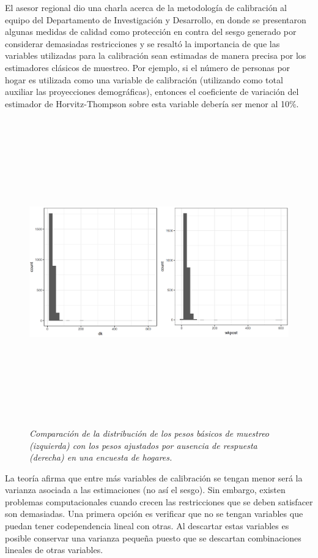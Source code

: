 \documentclass[
  12pt,
  spanish,
]{book}
\begin{document}
El asesor regional dio una charla acerca de la metodología de calibración al equipo del Departamento de Investigación y Desarrollo, en donde se presentaron algunas medidas de calidad como protección en contra del sesgo generado por considerar demasiadas restricciones y se resaltó la importancia de que las variables utilizadas para la calibración sean estimadas de manera precisa por los estimadores clásicos de muestreo. Por ejemplo, si el número de personas por hogar es utilizada como una variable de calibración (utilizando como total auxiliar las proyecciones demográficas), entonces el coeficiente de variación del estimador de Horvitz-Thompson sobre esta variable debería ser menor al 10\%.

\begin{figure}
\centering
\includegraphics[width=\textwidth,height=5.20833in]{Pics/18.png}
\caption{\emph{Comparación de la distribución de los pesos básicos de muestreo (izquierda) con los pesos ajustados por ausencia de respuesta (derecha) en una encuesta de hogares.}}
\end{figure}

La teoría afirma que entre más variables de calibración se tengan menor será la varianza asociada a las estimaciones (no así el sesgo). Sin embargo, existen problemas computacionales cuando crecen las restricciones que se deben satisfacer son demasiadas. Una primera opción es verificar que no se tengan variables que puedan tener codependencia lineal con otras. Al descartar estas variables es posible conservar una varianza pequeña puesto que se descartan combinaciones lineales de otras variables.
\end{document}
